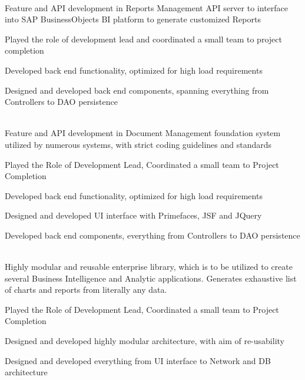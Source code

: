 \documentclass[]{deedy-resume-openfont}
\begin{document}

\clearpage

\hfill {}\\
Feature and API development in Reports Management API server to interface into SAP BusinessObjects BI platform to generate customized Reports\\
\begin{tightemize}
	\item Played the role of development lead and coordinated a small team to project completion
	\item Developed back end functionality, optimized for high load requirements
	\item Designed and developed back end components, spanning everything from Controllers to DAO persistence
\end{tightemize}
\sectionsep

\hfill {}\\
Feature and API development in Document Management foundation system utilized by numerous systems, with strict coding guidelines and standards\\
\begin{tightemize}
	\item Played the Role of Development Lead, Coordinated a small team to Project Completion
	\item Developed back end functionality, optimized for high load requirements
	\item Designed and developed UI interface with Primefaces, JSF and JQuery
	\item Developed back end components, everything from Controllers to DAO persistence
\end{tightemize}
\sectionsep

\hfill {}\\
Highly modular and reusable enterprise library, which is to be utilized to create several Business Intelligence and Analytic applications. Generates exhaustive list of charts and reports from literally any data.\\
\begin{tightemize}
	\item Played the Role of Development Lead, Coordinated a small team to Project Completion
	\item Designed and developed highly modular architecture, with aim of re-usability
	\item Designed and developed everything from UI interface to Network and DB architecture
\end{tightemize}
\sectionsep
\end{document}
